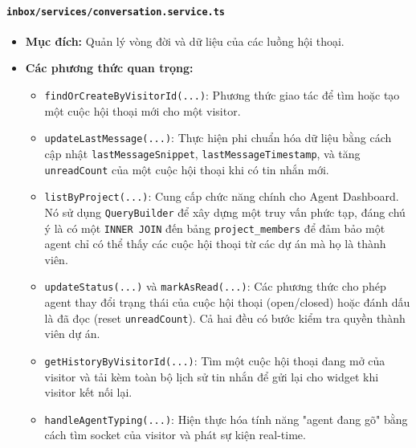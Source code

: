 \paragraph{\texttt{inbox/services/conversation.service.ts}}
\begin{itemize}
    \item \textbf{Mục đích:} Quản lý vòng đời và dữ liệu của các luồng hội thoại.
    \item \textbf{Các phương thức quan trọng:}
    \begin{itemize}
        \item \texttt{findOrCreateByVisitorId(...)}: Phương thức giao tác để tìm hoặc tạo một cuộc hội thoại mới cho một visitor.
        \item \texttt{updateLastMessage(...)}: Thực hiện phi chuẩn hóa dữ liệu bằng cách cập nhật \texttt{lastMessageSnippet}, \texttt{lastMessageTimestamp}, và tăng \texttt{unreadCount} của một cuộc hội thoại khi có tin nhắn mới.
        \item \texttt{listByProject(...)}: Cung cấp chức năng chính cho Agent Dashboard. Nó sử dụng \texttt{QueryBuilder} để xây dựng một truy vấn phức tạp, đáng chú ý là có một \texttt{INNER JOIN} đến bảng \texttt{project\_members} để đảm bảo một agent chỉ có thể thấy các cuộc hội thoại từ các dự án mà họ là thành viên.
        \item \texttt{updateStatus(...)} và \texttt{markAsRead(...)}: Các phương thức cho phép agent thay đổi trạng thái của cuộc hội thoại (open/closed) hoặc đánh dấu là đã đọc (reset \texttt{unreadCount}). Cả hai đều có bước kiểm tra quyền thành viên dự án.
        \item \texttt{getHistoryByVisitorId(...)}: Tìm một cuộc hội thoại đang mở của visitor và tải kèm toàn bộ lịch sử tin nhắn để gửi lại cho widget khi visitor kết nối lại.
        \item \texttt{handleAgentTyping(...)}: Hiện thực hóa tính năng "agent đang gõ" bằng cách tìm socket của visitor và phát sự kiện real-time.
    \end{itemize}
\end{itemize}

